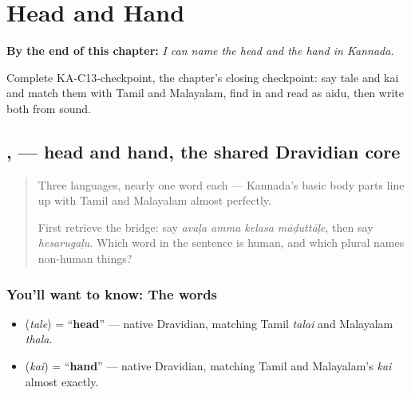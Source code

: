 
\chapter{Head and Hand}
\label{ch:ka-head-and-hand}

\begin{chapteropening}
\textbf{By the end of this chapter:} \emph{I can name the head and the hand in Kannada.}

Complete KA-C13-checkpoint, the chapter's closing checkpoint: say tale and kai and match them with Tamil and Malayalam, find  in  and read  as aidu, then write both from sound.
\end{chapteropening}

\section[\texorpdfstring{\kn{ತಲೆ} \kn{ಕೈ} (tale kai)}{ತಲೆ ಕೈ (tale kai)}]{,  — head and hand, the shared Dravidian core}

\label{lesson:KA-C13-dehada-bhagagalu}



\begin{quote}
Three languages, nearly one word each — Kannada's basic body parts line up with Tamil and Malayalam almost perfectly.

First retrieve the bridge: say \emph{avaḷa amma kelasa māḍuttāḷe}, then say \emph{hesarugaḷu}. Which word in the sentence is human, and which plural names non-human things?
\end{quote}

\subsection*{You'll want to know: The words}
\begin{itemize}
\raggedright
  \item \textbf{} (\emph{tale}) = \textquotedblleft{}\textbf{head}\textquotedblright{} — native Dravidian, matching Tamil \emph{talai} and Malayalam \emph{thala}.
  \item \textbf{} (\emph{kai}) = \textquotedblleft{}\textbf{hand}\textquotedblright{} — native Dravidian, matching Tamil and Malayalam's \emph{kai} almost exactly.
\end{itemize}


